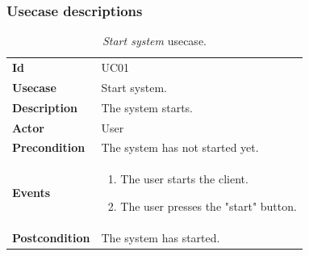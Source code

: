 \clearpage
\subsubsection{Usecase descriptions}
\begin{table}[h!t]
    \centering
    \caption{\emph{Start system} usecase.}
    \label{tab:uc:system}
    \centering
    \begin{tabular}{l | p{80mm}}
        \textbf{Id}            & UC01                            \\
        \textbf{Usecase}       & Start system.                   \\
        \textbf{Description}   & The system starts.              \\
        \textbf{Actor}         & User                            \\
        \textbf{Precondition}  & The system has not started yet. \\
        \textbf{Events}        & \begin{enumerate}
            \item The user starts the client.
            \item The user presses the "start" button.
        \end{enumerate}      \\
        \textbf{Postcondition} & The system has started.
    \end{tabular}
\end{table}

